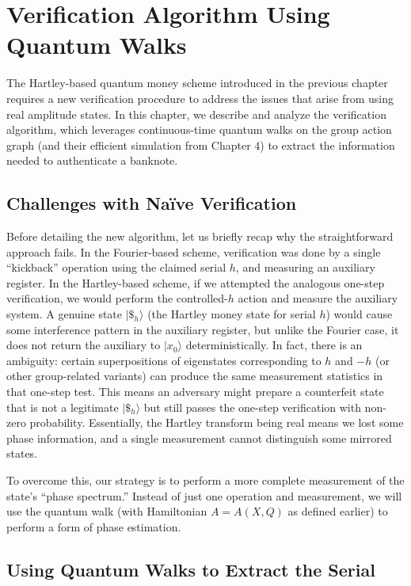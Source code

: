\documentclass[12pt]{report}
\begin{document}
\chapter{Verification Algorithm Using Quantum Walks}

The Hartley-based quantum money scheme introduced in the previous chapter requires a new verification procedure to address the issues that arise from using real amplitude states. In this chapter, we describe and analyze the verification algorithm, which leverages continuous-time quantum walks on the group action graph (and their efficient simulation from Chapter 4) to extract the information needed to authenticate a banknote.

    \section{Challenges with Naïve Verification}
    Before detailing the new algorithm, let us briefly recap why the straightforward approach fails. In the Fourier-based scheme, verification was done by a single “kickback” operation using the claimed serial $h$, and measuring an auxiliary register. In the Hartley-based scheme, if we attempted the analogous one-step verification, we would perform the controlled-$h$ action and measure the auxiliary system. A genuine state $|\$_h\rangle$ (the Hartley money state for serial $h$) would cause some interference pattern in the auxiliary register, but unlike the Fourier case, it does not return the auxiliary to $|x_0\rangle$ deterministically. In fact, there is an ambiguity: certain superpositions of eigenstates corresponding to $h$ and $-h$ (or other group-related variants) can produce the same measurement statistics in that one-step test. This means an adversary might prepare a counterfeit state that is not a legitimate $|\$_h\rangle$ but still passes the one-step verification with non-zero probability. Essentially, the Hartley transform being real means we lost some phase information, and a single measurement cannot distinguish some mirrored states.

    To overcome this, our strategy is to perform a more complete measurement of the state’s “phase spectrum.” Instead of just one operation and measurement, we will use the quantum walk (with Hamiltonian $A = A(X,Q)$ as defined earlier) to perform a form of phase estimation.

    \section{Using Quantum Walks to Extract the Serial}
    
\end{document}
